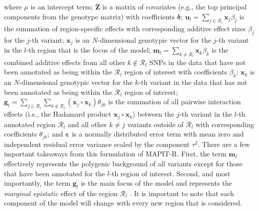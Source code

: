 \documentclass[10pt]{article}
\newcommand{\bg}{\mathbf{g}}
\newcommand{\bx}{\mathbf{x}}
\newcommand{\bu}{\mathbf{u}}
\newcommand{\bfm}{\mathbf{m}}
\newcommand{\bZ}{\mathbf{Z}}
\newcommand{\bvarepsilon}{\boldsymbol\varepsilon}
\newcommand{\bdelta}{\boldsymbol\delta}
\begin{document}
where $\mu$ is an intercept term; $\bZ$ is a matrix of covariates (e.g., the top principal components from the genotype matrix) with coefficients $\bdelta$; $\bu_l = \sum_{j\in\mathcal{R}_l}\bx_j\beta_j$ is the summation of region-specific effects with corresponding additive effect sizes $\beta_j$ for the $j$-th variant; $\bx_j$ is an $N$-dimensional genotypic vector for the $j$-th variant in the $l$-th region that is the focus of the model; $\bfm_l = \sum_{k\ne\mathcal{R}_l}\bx_k\beta_k$ is the combined additive effects from all other $k\not\in\mathcal{R}_l$ SNPs in the data that have not been annotated as being within the $\mathcal{R}_l$ region of interest with coefficients $\beta_k$; $\bx_k$ is an $N$-dimensional genotypic vector for the $k$-th variant in the data that has not been annotated as being within the $\mathcal{R}_l$ region of interest; $\bg_l = \sum_{j\in\mathcal{R}_l}\sum_{k\not\in\mathcal{R}_l}(\bx_j\circ\bx_k)\theta_{jk}$ is the summation of all pairwise interaction effects (i.e., the Hadamard product $\bx_j\circ\bx_k$) between the $j$-th variant in the $l$-th annotated region $\mathcal{R}_l$ and all other $k\ne j$ variants outside of $\mathcal{R}_l$ with corresponding coefficients $\theta_{jk}$; and $\bvarepsilon$ is a normally distributed error term with mean zero and independent residual error variance scaled by the component $\tau^2$. There are a few important takeaways from this formulation of MAPIT-R. First, the term $\bfm_l$ effectively represents the polygenic background of all variants except for those that have been annotated for the $l$-th region of interest. Second, and most importantly, the term $\bg_l$ is the main focus of the model and represents the \textit{marginal epistatic} effect of the region $\mathcal{R}_l$ \cite{Crawford2017a,Crawford2018b}. It is important to note that each component of the model will change with every new region that is considered.
\end{document}
